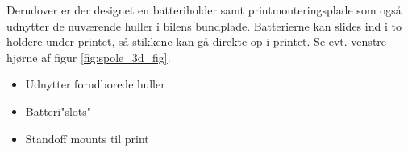 Derudover er der designet en batteriholder samt printmonteringsplade som også udnytter de nuværende huller i bilens bundplade. Batterierne kan slides ind i to holdere under printet, så stikkene kan gå direkte op i printet. Se evt. venstre hjørne af figur \ref{fig:spole_3d_fig}.\\

\begin {itemize}
\item Udnytter forudborede huller
\item Batteri"slots"
\item Standoff mounts til print
\end {itemize}